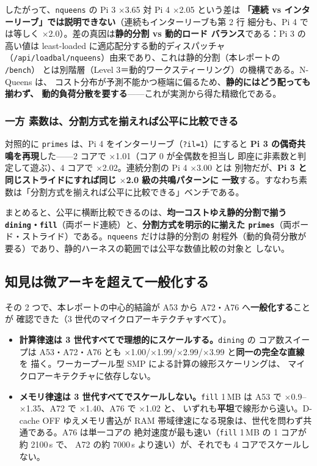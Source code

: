 \documentclass[11pt,a4paper]{article}
\newcommand{\bench}[1]{\texttt{#1}}
\newcommand{\route}[1]{\texttt{#1}}
\newcommand{\spd}[1]{$\times$#1}
\begin{document}
したがって、\bench{nqueens} の Pi 3 \spd{3.65} 対 Pi 4 \spd{2.05} という差は
\textbf{「連続 vs インターリーブ」では説明できない}（連続もインターリーブも第 2 行
細分も、Pi 4 では等しく \spd{2.0}）。差の真因は\textbf{静的分割 vs 動的ロード
バランス}である：Pi 3 の高い値は least-loaded に適応配分する動的ディスパッチャ
（\route{/api/loadbal/nqueens}）由来であり、これは静的分割（本レポートの \route{/bench}）
とは別階層（Level 3＝動的ワークスティーリング）の機構である。N-Queens は、
コスト分布が予測不能かつ極端に偏るため、\textbf{静的にはどう配っても揃わず、
動的負荷分散を要する}——これが実測から得た精緻化である。

\subsubsection*{一方 素数は、分割方式を揃えれば公平に比較できる}

対照的に \bench{primes} は、Pi 4 をインターリーブ（\texttt{?il=1}）にすると
\textbf{Pi 3 の偶奇共鳴を再現}した——2 コアで \spd{1.01}（コア 0 が全偶数を担当し
即座に非素数と判定して遊ぶ）、4 コアで \spd{2.02}。連続分割の Pi 4 \spd{3.00} とは
別物だが、\textbf{Pi 3 と同じストライドにすれば同じ \spd{2.0} 級の共鳴パターンに
一致}する。すなわち素数は「分割方式を揃えれば公平に比較できる」ベンチである。

\medskip
\noindent
まとめると、公平に横断比較できるのは、\textbf{均一コストゆえ静的分割で揃う
\bench{dining}・\bench{fill}}（両ボード連続）と、\textbf{分割方式を明示的に揃えた
\bench{primes}}（両ボード・ストライド）である。\bench{nqueens} だけは静的分割の
射程外（動的負荷分散が要る）であり、静的ハーネスの範囲では公平な数値比較の対象と
しない。

\subsection{知見は微アーキを超えて一般化する}

その 2 つで、本レポートの中心的結論が A53 から A72・A76 へ\textbf{一般化する}ことが
確認できた（3 世代のマイクロアーキテクチャすべて）。

\begin{itemize}[leftmargin=1.6em]
  \item \textbf{計算律速は 3 世代すべてで理想的にスケールする。}\bench{dining} の
        コア数スイープは A53・A72・A76 とも
        \spd{1.00}/\spd{1.99}/\spd{2.99}/\spd{3.99} と\textbf{同一の完全な直線}を
        描く。ワーカープール型 SMP による計算の線形スケーリングは、
        マイクロアーキテクチャに依存しない。
  \item \textbf{メモリ律速は 3 世代すべてでスケールしない。}\bench{fill} 1\,MB は
        A53 で \spd{0.9}--\spd{1.35}、A72 で \spd{1.40}、A76 で \spd{1.02} と、
        いずれも\textbf{平坦}で線形から遠い。D-cache OFF ゆえメモリ書込が
        RAM 帯域律速になる現象は、世代を問わず共通である。A76 は単一コアの
        絶対速度が最も速い（\bench{fill} 1\,MB の 1 コアが約 2100\,\textmu s で、
        A72 の約 7000\,\textmu s より速い）が、それでも 4 コアでスケールしない。
\end{itemize}
\end{document}
